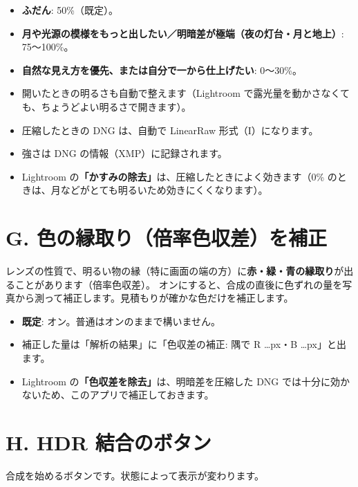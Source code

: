 \documentclass[paper=a4paper,fontsize=11pt,report,jafontsize=11pt]{jlreq}
\newcommand{\ui}[1]{\textsf{\textbf{「#1」}}}
\begin{document}
\begin{tip}[変えるときの目安]
\begin{itemize}
  \item \textbf{ふだん}: 50\%（既定）。
  \item \textbf{月や光源の模様をもっと出したい／明暗差が極端（夜の灯台・月と地上）}: 75〜100\%。
  \item \textbf{自然な見え方を優先、または自分で一から仕上げたい}: 0〜30\%。
\end{itemize}
\end{tip}

\begin{memo}
\begin{itemize}
  \item 開いたときの明るさも自動で整えます（Lightroom で露光量を動かさなくても、ちょうどよい明るさで開きます）。
  \item 圧縮したときの DNG は、自動で LinearRaw 形式（I）になります。
  \item 強さは DNG の情報（XMP）に記録されます。
  \item Lightroom の\ui{かすみの除去}は、圧縮したときによく効きます（0\% のときは、月などがとても明るいため効きにくくなります）。
\end{itemize}
\end{memo}

\section{G. 色の縁取り（倍率色収差）を補正}
レンズの性質で、明るい物の縁（特に画面の端の方）に\textbf{赤・緑・青の縁取り}が出ることがあります（倍率色収差）。
オンにすると、合成の直後に色ずれの量を写真から測って補正します。見積もりが確かな色だけを補正します。
\begin{itemize}
  \item \textbf{既定}: オン。普通はオンのままで構いません。
  \item 補正した量は「解析の結果」に「色収差の補正: 隅で R …px・B …px」と出ます。
  \item Lightroom の\ui{色収差を除去}は、明暗差を圧縮した DNG では十分に効かないため、このアプリで補正しておきます。
\end{itemize}

\section{H. HDR 結合のボタン}
合成を始めるボタンです。状態によって表示が変わります。
\end{document}
